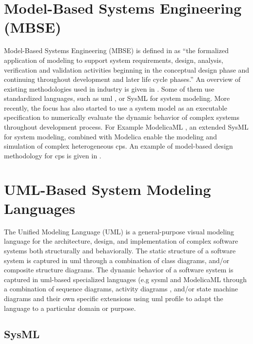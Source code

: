 \section{Model-Based Systems Engineering (MBSE)}
\label{sec:mbse}

Model-Based Systems Engineering (MBSE) is defined in \cite{mbsdincose} as “the formalized application of modeling to support system requirements, design, analysis, verification and validation activities beginning in the conceptual design phase and continuing throughout development and later life cycle phases.” An overview of existing methodologies used in industry is given in \cite{mbsdestefan}. Some of them use standardized languages, such as \acrshort{uml} \cite{uml}, or SysML \cite{sysml} for system modeling. 
More recently, the focus has also started to use a system model as an executable specification to numerically evaluate the dynamic behavior of complex systems throughout development process. For Example ModelicaML \cite{modelicaml, modelicamlreport}, an extended SysML for system modeling, combined with Modelica enable the modeling and simulation of complex heterogeneous \acrshort{cps}. An example of model-based design methodology for \acrshort{cps} is given in \cite{mbsdjensen}.


\section{UML-Based System Modeling Languages}
\label{sec:uml}
   
The Unified Modeling Language (UML) \cite{uml} is a general-purpose visual modeling language for the architecture, design, and implementation of complex software systems both structurally and behaviorally. The static structure of a software system is captured in \acrshort{uml} through a combination of class diagrams, and/or composite structure diagrams. The dynamic behavior of a software system is captured in \acrshort{uml}-based specialized languages (e.g \acrshort{sysml}\cite{sysml,sysmlmorgan} and ModelicaML\cite{modelicaml, modelicamlreport} through a combination of sequence diagrams, activity diagrams , and/or state machine diagrams and their own specific extensions using \acrshort{uml} profile to adapt the language to a particular domain or purpose. 

\subsection{SysML}
\label{sec:sysml}


